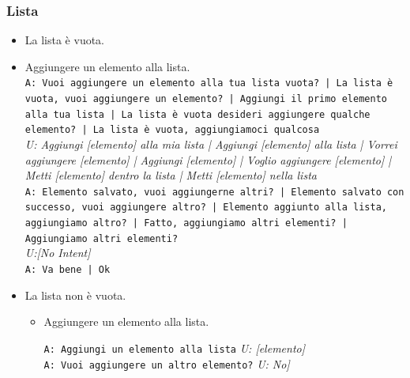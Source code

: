 \subsubsection{Lista}
\begin{itemize}
	\item La lista è vuota.\\
	\item Aggiungere un elemento alla lista.\\
	\texttt{A: Vuoi aggiungere un elemento alla tua lista vuota? | La lista  è vuota, vuoi aggiungere un elemento? | Aggiungi il primo elemento alla tua lista | La lista è vuota desideri aggiungere qualche elemento? | La lista è vuota, aggiungiamoci qualcosa }\\
	\textit{U: Aggiungi [elemento] alla mia lista | Aggiungi [elemento] alla lista | Vorrei aggiungere [elemento] | Aggiungi [elemento] | Voglio aggiungere [elemento] | Metti [elemento] dentro la lista | Metti [elemento] nella lista }\\
	\texttt{A: Elemento salvato, vuoi aggiungerne altri? | Elemento salvato con successo, vuoi aggiungere altro? | Elemento aggiunto alla lista, aggiungiamo altro? | Fatto, aggiungiamo altri elementi? | Aggiungiamo altri elementi? }\\
	\textit{U:[No Intent]}\\
	\texttt{A: Va bene | Ok }\\ 
	
	\item La lista non è vuota.\\
	\begin{itemize}
		\item Aggiungere un elemento alla lista.

		\texttt{A: Aggiungi un elemento alla lista}
		\textit{U: [elemento]}\\
       \texttt{A: Vuoi aggiungere un altro elemento?}
       	\textit{U: No]}\\
		

\end{itemize}
\end{itemize}

